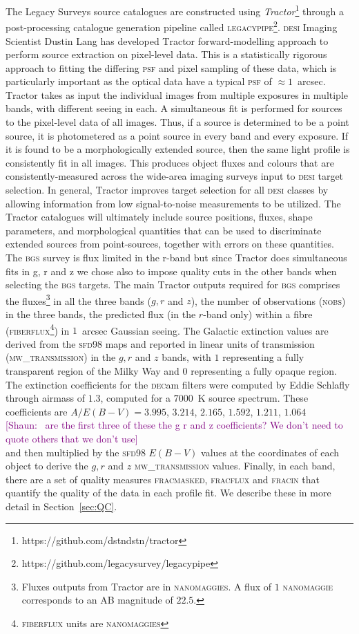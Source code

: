 \documentclass[fleqn,usenatbib]{mnras}
\newcommand{\shaun}[1]{~\newline\noindent \textcolor{Purple}{{ [Shaun:~{#1}]\\}}}
\newcommand{\BGS}{\textsc{bgs}\xspace}
\newcommand{\DECam}{\textsc{dec}am\xspace}
\newcommand{\DESI}{\textsc{desi}\xspace}
\newcommand{\FIBERFLUX}{{\textsc{fiberflux}}\xspace}
\newcommand{\FRACMASKED}{{\textsc{fracmasked}}\xspace}
\newcommand{\FRACFLUX}{{\textsc{fracflux}}\xspace}
\newcommand{\FRACIN}{{\textsc{fracin}}\xspace}
\newcommand{\MWTRANSMISSION}{{\textsc{mw\_transmission}}\xspace}
\newcommand{\NOBS}{\textsc{nobs}\xspace}
\newcommand{\PSF}{\textsc{psf}\xspace}
\newcommand{\TRACTOR}{\textsc{T}ractor\xspace}
\newcommand{\LEGACYPIPE}{\textsc{legacypipe}\xspace}
\newcommand{\NANOMAGIES}{\textsc{nanomaggies}\xspace}
\newcommand{\NANOMAGIE}{\textsc{nanomaggie}\xspace}
\begin{document}
The Legacy Surveys source catalogues are constructed using {\it Tractor}\footnote{https://github.com/dstndstn/tractor}\citep{2016ascl.soft04008L} through a post-processing catalogue generation pipeline called \LEGACYPIPE \footnote{https://github.com/legacysurvey/legacypipe}. \DESI Imaging Scientist Dustin Lang has developed \TRACTOR forward-modelling approach to
perform source extraction on pixel-level data. This is a statistically rigorous approach to fitting the differing \PSF and pixel sampling of these data, which is particularly important as the optical data have a typical \PSF of $\approx 1$~arcsec.
\TRACTOR takes as input the individual images from multiple exposures in multiple
bands, with different seeing in each. A simultaneous fit is performed for sources to the pixel-level data of all images. Thus, if a source is determined to be a point source, it is photometered as a point source in every band and every exposure. If it is found to be a morphologically extended source, then the same light profile is consistently fit in all images. This produces object fluxes and colours that are consistently-measured across the wide-area imaging surveys input to \DESI target selection. In general, \TRACTOR improves target selection for all \DESI classes by allowing information from low signal-to-noise measurements to be utilized. The \TRACTOR catalogues will ultimately include source positions, fluxes, shape parameters, and morphological quantities that can be used to discriminate extended sources from point-sources, together with errors on these quantities. The \BGS survey is flux limited in the r-band but since \TRACTOR does simultaneous fits in g, r and z we chose also to impose quality cuts in the other bands when selecting the \BGS targets. The main \TRACTOR outputs required for \BGS comprises the fluxes\footnote{Fluxes outputs from \TRACTOR are in \NANOMAGIES. A flux of $1$ \NANOMAGIE corresponds to an AB magnitude of $22.5$.} in all the three bands ($g,r$ and $z$), the number of observations (\NOBS) in the three bands, the predicted flux (in the $r$-band only) within a fibre (\FIBERFLUX\footnote{\FIBERFLUX units are \NANOMAGIES}) in $1$~arcsec Gaussian seeing. The Galactic extinction values are derived from the \textsc{sfd98} maps \citep{1998ApJ...500..525S} and reported in linear units of transmission (\MWTRANSMISSION) in the $g,r$ and $z$ bands, with $1$ representing a fully transparent region of the Milky Way and $0$ representing a fully opaque region. The extinction coefficients for the \DECam filters were computed by Eddie Schlafly \citep{2011ApJ...737..103S} through airmass of $1.3$, computed for a $7000$~K source spectrum. These coefficients are $A / E(B-V) = 3.995$, $3.214$, $2.165$, $1.592$, $1.211$, $1.064$ 
\shaun{ are the first three of these the g r and z coefficients? We don't need to quote others that we don't use}
and then multiplied by the \textsc{sfd98} $E(B-V)$ values at the coordinates of each object to derive the $g, r$ and $z$ \MWTRANSMISSION values. Finally, in each band, there are a set of quality measures
\FRACMASKED, \FRACFLUX and \FRACIN that quantify the quality of the data in each profile fit. We describe these in more detail in Section~\ref{sec:QC}.
\end{document}
